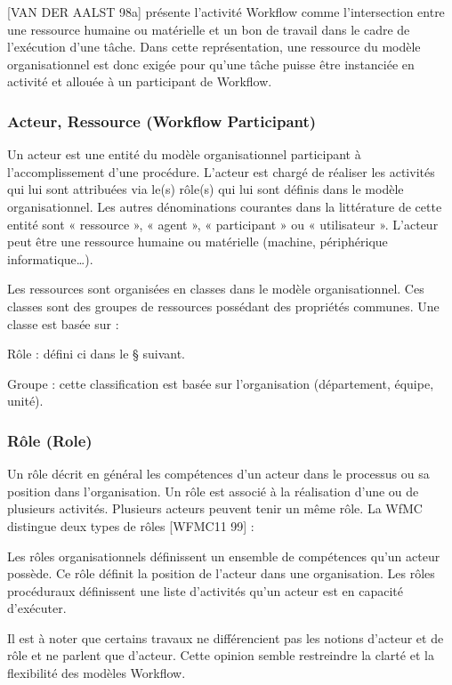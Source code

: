  	 [VAN DER AALST 98a] présente l’activité Workflow comme l’intersection entre une ressource humaine ou matérielle et un bon de travail dans le cadre de l’exécution d’une tâche. Dans cette représentation, une ressource du modèle organisationnel est donc exigée pour qu’une tâche puisse être instanciée en activité et allouée à un participant de Workflow. 
 	 
 	 
 	 
 	  	 \subsubsection{ Acteur, Ressource (Workflow Participant) }
 	 
 	Un acteur est une entité du modèle organisationnel participant à l’accomplissement d’une procédure. L’acteur est chargé de réaliser les activités qui lui sont attribuées via le(s) rôle(s) qui lui sont définis dans le modèle organisationnel. Les autres dénominations courantes dans la littérature de cette entité sont « ressource », « agent », « participant » ou « utilisateur ». L’acteur peut être une ressource humaine ou matérielle (machine, périphérique informatique…).
 	 
 	 Les ressources sont organisées en classes dans le modèle organisationnel. Ces classes sont des groupes de ressources possédant des propriétés communes. Une classe est basée sur :
 	 
 	  Rôle : défini ci dans le § suivant. 
 	  
 	 Groupe : cette classification est basée sur l’organisation (département, équipe, unité). 
 	 
 	 \subsubsection{ Rôle (Role) }
 	 
 	 
 	 Un rôle décrit en général les compétences d’un acteur dans le processus ou sa position dans l’organisation. Un rôle est associé à la réalisation d’une ou de plusieurs activités. Plusieurs acteurs peuvent tenir un même rôle. La WfMC distingue deux types de rôles [WFMC11 99] :
 	 
 	 Les rôles organisationnels définissent un ensemble de compétences qu’un acteur possède. Ce rôle définit la position de l’acteur dans une organisation. Les rôles procéduraux définissent une liste d’activités qu’un acteur est en capacité d’exécuter. 
 	 
 	 Il est à noter que certains travaux ne différencient pas les notions d’acteur et de rôle et ne parlent que d’acteur. Cette opinion semble restreindre la clarté et la flexibilité des modèles Workflow. 
 	 
